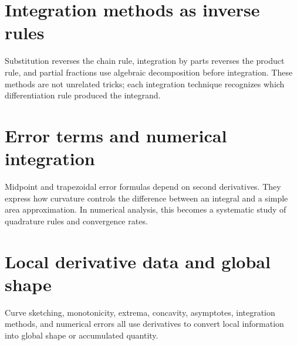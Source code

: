 \section{Integration methods as inverse rules}

Substitution reverses the chain rule, integration by parts reverses the product rule, and partial fractions use algebraic decomposition before integration.  These methods are not unrelated tricks; each integration technique recognizes which differentiation rule produced the integrand.

\section{Error terms and numerical integration}

Midpoint and trapezoidal error formulas depend on second derivatives.  They express how curvature controls the difference between an integral and a simple area approximation.  In numerical analysis, this becomes a systematic study of quadrature rules and convergence rates.

\section{Local derivative data and global shape}

Curve sketching, monotonicity, extrema, concavity, asymptotes, integration methods, and numerical errors all use derivatives to convert local information into global shape or accumulated quantity.
